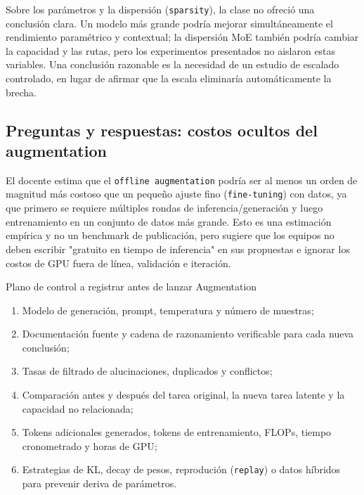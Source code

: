 Sobre los parámetros y la dispersión (\texttt{sparsity}), la clase no ofreció una conclusión clara. Un modelo más grande podría mejorar simultáneamente el rendimiento paramétrico y contextual; la dispersión MoE también podría cambiar la capacidad y las rutas, pero los experimentos presentados no aislaron estas variables. Una conclusión razonable es la necesidad de un estudio de escalado controlado, en lugar de afirmar que la escala eliminaría automáticamente la brecha.

\subsection{Preguntas y respuestas: costos ocultos del augmentation}

El docente estima que el \texttt{offline augmentation} podría ser al menos un orden de magnitud más costoso que un pequeño ajuste fino (\texttt{fine-tuning}) con datos, ya que primero se requiere múltiples rondas de inferencia/generación y luego entrenamiento en un conjunto de datos más grande. Esto es una estimación empírica y no un benchmark de publicación, pero sugiere que los equipos no deben escribir "gratuito en tiempo de inferencia" en sus propuestas e ignorar los costos de GPU fuera de línea, validación e iteración.


\begin{knowledgebox}{Plano de control a registrar antes de lanzar Augmentation}
\begin{enumerate}
  \item Modelo de generación, prompt, temperatura y número de muestras;
  \item Documentación fuente y cadena de razonamiento verificable para cada nueva conclusión;
  \item Tasas de filtrado de alucinaciones, duplicados y conflictos;
  \item Comparación antes y después del tarea original, la nueva tarea latente y la capacidad no relacionada;
  \item Tokens adicionales generados, tokens de entrenamiento, FLOPs, tiempo cronometrado y horas de GPU;
  \item Estrategias de KL, decay de pesos, reprodución (\texttt{replay}) o datos híbridos para prevenir deriva de parámetros.
\end{enumerate}
\end{knowledgebox}

